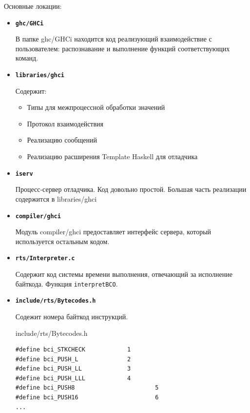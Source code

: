 \documentclass[fontsize=14pt, paper=a4, pagesize, DIV=calc]{scrartcl}
\begin{document}
Основные локации:

\begin{itemize}

\item \textbf{\texttt{ghc/GHCi}}

В папке ghc/GHCi находится код реализующий взаимодействие с пользователем:
распознавание и выполнение функций соответствующих команд.

\item \textbf{\texttt{libraries/ghci}}

Содержит:

\begin{itemize}
\item Типы для межпроцессной обработки значений
\item Протокол взаимодействия
\item Реализацию сообщений
\item Реализацию расширения Template Haskell для отладчика
\end{itemize}

\item \textbf{\texttt{iserv}}

Процесс-сервер отладчика. Код довольно простой. Большая часть реализации
содержится в libraries/ghci

\item \textbf{\texttt{compiler/ghci}}

Модуль compiler/ghci предоставляет интерфейс сервера, который используется
остальным кодом.

\item \textbf{\texttt{rts/Interpreter.c}}

Содержит код системы времени выполнения, отвечающий за исполнение байткода. 
Функция \texttt{interpretBCO}.

\item \textbf{\texttt{include/rts/Bytecodes.h}}

Содежит номера байткод инструкций.

\begin{ListingEnv}
\caption{include/rts/Bytecodes.h}
\begin{lstlisting}[firstnumber=26]
#define bci_STKCHECK            1
#define bci_PUSH_L              2
#define bci_PUSH_LL             3
#define bci_PUSH_LLL            4
#define bci_PUSH8                       5
#define bci_PUSH16                      6
...
\end{lstlisting}
\end{ListingEnv}

\end{itemize}
\end{document}
